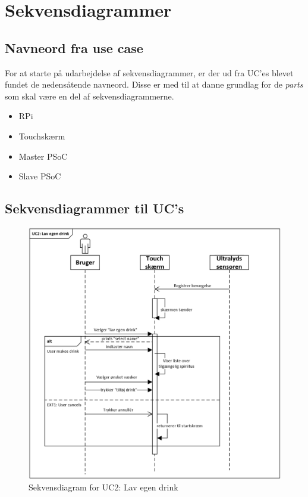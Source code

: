 \section{Sekvensdiagrammer}

\subsection{Navneord fra use case}

For at starte på udarbejdelse af sekvensdiagrammer, er der ud fra UC'es blevet fundet de nedensåtende navneord. Disse er med til at danne grundlag for de \textit{parts} som skal være en del af sekvensdiagrammerne.

\begin{itemize}
    \item RPi
    \item Touchskærm
    \item Master PSoC
    \item Slave PSoC
\end{itemize}

\subsection{Sekvensdiagrammer til UC's}

\begin{figure}[H]
	\centering
	\includegraphics[width=1\textwidth]{Images/UC2lavegendrink.png}
	\caption{Sekvensdiagram for UC2: Lav egen drink }
	\label{fig:UC2}
\end{figure}

